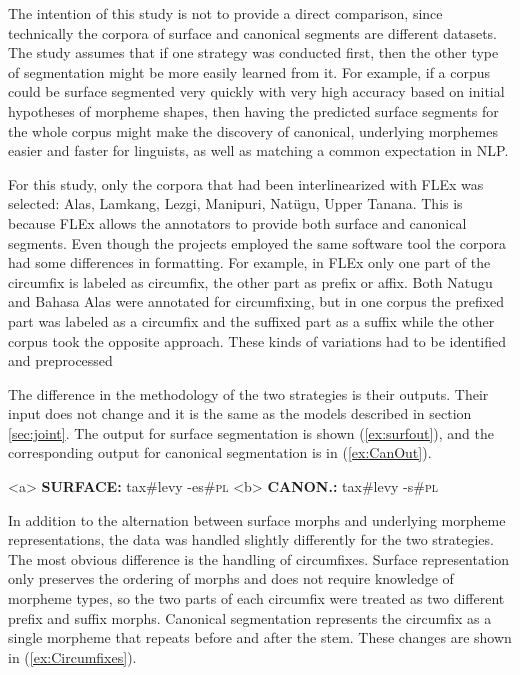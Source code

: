 The intention of this study is not to provide a direct comparison, since technically the corpora of surface and canonical segments are different datasets. The study assumes that if one strategy was conducted first, then the other type of segmentation might be more easily learned from it. For example, if a corpus could be surface segmented very quickly with very high accuracy based on initial hypotheses of morpheme shapes, then having the predicted surface segments for the whole corpus might make the discovery of canonical, underlying morphemes easier and faster for linguists, as well as matching a common expectation in NLP. 

For this study, only the corpora that had been interlinearized with FLEx was selected:  Alas, Lamkang, Lezgi, Manipuri, Nat\"ugu, Upper Tanana. This is because FLEx allows the annotators to provide both surface and canonical segments.
Even though the projects employed the same software tool the corpora had some differences in formatting. For example, in FLEx only one part of the circumfix is labeled as circumfix, the other part as prefix or affix. Both Natugu and Bahasa Alas were annotated for circumfixing, but in one corpus the prefixed part was labeled as a circumfix and the suffixed part as a suffix while the other corpus took the opposite approach. These kinds of variations had to be identified and preprocessed

The difference in the methodology of the two strategies is their outputs. Their input does not change and it is the same as the models described in section \ref{sec:joint}. The output for surface segmentation is shown (\ref{ex:surfout}), and the corresponding output for canonical segmentation is in (\ref{ex:CanOut}).

\pex   
\label{ex:CanInOut}
\a<a> \textbf{SURFACE:} \hspace{2 mm} tax\#levy \hspace{3 mm} -es\#\textsc{pl}
\label{ex:surfout}
\a<b> \textbf{CANON.:} \hspace{4 mm} tax\#levy \hspace{3 mm} -s\#\textsc{pl} 
\label{ex:CanOut}
\xe

In addition to the alternation between surface morphs and underlying morpheme representations, the data was handled slightly differently for the two strategies. The most obvious difference is the handling of circumfixes. Surface representation only preserves the ordering of morphs and does not require knowledge of morpheme types, so the two parts of each circumfix were treated as two different prefix and suffix morphs.  Canonical segmentation represents the circumfix as a single morpheme that repeats before and after the stem. These changes are shown in (\ref{ex:Circumfixes}).

